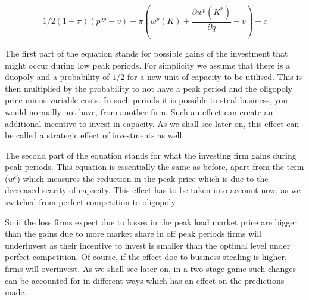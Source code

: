 \begin{equation}
	1/2 (1-\pi) (p^{op}-v) + \pi (w^p(K)+\frac{\partial w^p(K^*)}{\partial q}-v) - c
\end{equation}

The first part of the equation stands for possible gains of the investment that might occur during low peak periods. For simplicity we assume that there is a duopoly and a probability of $1/2$ for a new unit of capacity to be utilised. This is then multiplied by the probability to not have a peak period and the oligopoly price minus variable costs. In such periods it is possible to steal business, you would normally not have, from another firm. Such an effect can create an additional incentive to invest in capacity. As we shall see later on, this effect can be called a strategic effect of investments as well.

The second part of the equation stands for what the investing firm gains during peak periods. This equation is essentially the same as before, apart from the term ($w^{\acute{c}}$) which measures the reduction in the peak price which is due to the decreased scarity of capacity. This effect has to be taken into account now, as we switched from perfect competition to oligopoly.

So if the loss firms expect due to losses in the peak load market price are bigger than the gains due to more market share in off peak periods firms will underinvest as their incentive to invest is smaller than the optimal level under perfect competition. Of course, if the effect doe to business stealing is higher, firms will overinvest. As we shall see later on, in a two stage game such changes can be accounted for in different ways which has an effect on the predictions made.

